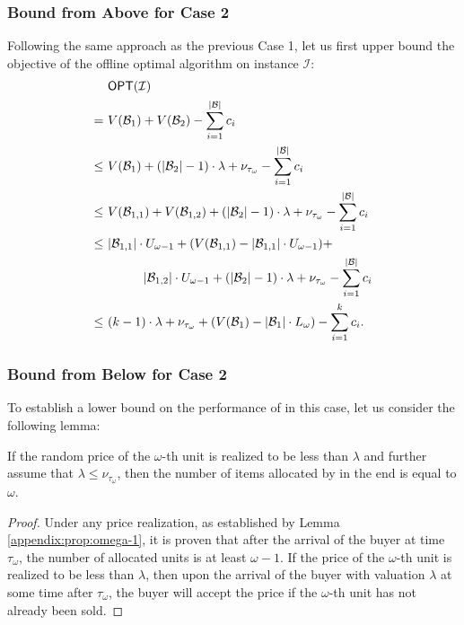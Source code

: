 \subsubsection{Bound \OPT from Above for Case 2}
Following the same approach as the previous Case 1, let us first upper bound the objective of the offline optimal algorithm on instance $\mathcal{I}$:
\begin{align*}
     & \textsf{OPT}(\mathcal{I}) \\
     =\ & V(\mathcal{B}_{1}) + V(\mathcal{B}_{2}) - \sum_{i=1}^{|\mathcal{B}|} c_{i}\\ 
    \leq\ & V(\mathcal{B}_{1}) + (|\mathcal{B}_{2}|-1) \cdot \lambda + \nu_{\tau_{\omega}} - \sum_{i=1}^{|\mathcal{B}|} c_{i} \\
    \leq\ &  V(\mathcal{B}_{1,1}) + V(\mathcal{B}_{1,2}) + (|\mathcal{B}_{2}|-1) \cdot \lambda + \nu_{\tau_{\omega}} - \sum_{i=1}^{|\mathcal{B}|} c_{i} \\
    \leq\ &  |\mathcal{B}_{1,1}| \cdot U_{\omega-1} + (V(\mathcal{B}_{1,1}) - |\mathcal{B}_{1,1}| \cdot U_{\omega-1} ) + \\
    & \hspace{1cm} |\mathcal{B}_{1,2}| \cdot U_{\omega-1} + (|\mathcal{B}_{2}|-1) \cdot \lambda + \nu_{\tau_{\omega}} - \sum_{i=1}^{|\mathcal{B}|} c_{i} \\
    \leq\ & (k-1) \cdot \lambda + \nu_{\tau_{\omega}} + (V(\mathcal{B}_{1}) - |\mathcal{B}_{1}| \cdot L_{\omega} ) - \sum_{i=1}^{k} c_{i}.
\end{align*}
 

\subsubsection{Bound \ALG from Below for Case 2}
To establish a lower bound on the performance of \rDynamic in this case, let us consider the following lemma:
\begin{lemma}
\label{claim4-upper-bound-k-selection}
    If the random price of the $\omega$-th unit is realized to be less than $\lambda$ and further assume that $\lambda \leq \nu_{\tau_{\omega}}$, 
    then the number of items allocated by \rDynamic in the end is equal to $\omega$.
\end{lemma}
\begin{proof}
Under any price realization, as established by Lemma \ref{appendix:prop:omega-1}, it is proven that after the arrival of the buyer at time $\tau_{\omega}$, the number of allocated units is at least $\omega-1$. If the price of the $\omega$-th unit is realized to be less than $\lambda$, then upon the arrival of the buyer with valuation $\lambda$ at some time after $\tau_{\omega}$, the buyer will accept the price if the $\omega$-th unit has not already been sold. 
\end{proof}

